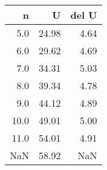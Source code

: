 \begin{tabular}{rrr}
\toprule
   n &     U &  del U \\
\midrule
 5.0 & 24.98 &   4.64 \\
 6.0 & 29.62 &   4.69 \\
 7.0 & 34.31 &   5.03 \\
 8.0 & 39.34 &   4.78 \\
 9.0 & 44.12 &   4.89 \\
10.0 & 49.01 &   5.00 \\
11.0 & 54.01 &   4.91 \\
 NaN & 58.92 &    NaN \\
\bottomrule
\end{tabular}
